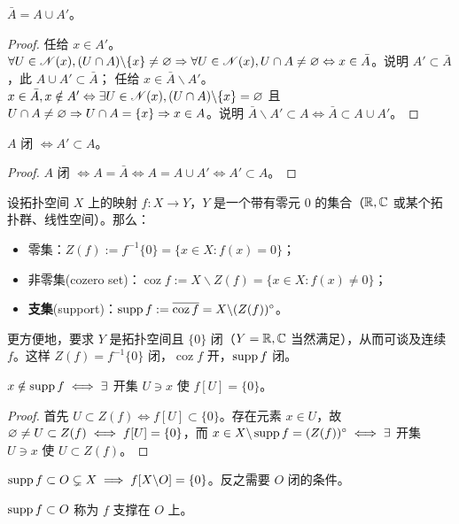 \begin{theorem}
    $\bar A=A\cup A'$。  
\end{theorem}

\begin{proof}
    任给 $x\in A'$。$\forall U\in\mathscr N(x),(U\cap A)\backslash\{x\}\ne\varnothing\Rightarrow \forall U\in\mathscr N(x),U\cap A\ne\varnothing\Leftrightarrow x\in\bar A$。说明 $A'\subset \bar A$，此 $A\cup A'\subset\bar A$；
    任给 $x\in\bar A\backslash A'$。$x\in\bar A,x\notin A'\Leftrightarrow \exists U\in\mathscr N(x),(U\cap A)\backslash\{x\}=\varnothing$ 且 $U\cap A\ne\varnothing\Rightarrow U\cap A=\{x\}\Rightarrow x\in A$。说明 $\bar A\backslash A'\subset A\iff \bar A\subset A\cup A'$。
\end{proof}

\begin{theorem}
    $A$ 闭 $\iff A'\subset A$。
\end{theorem}
\begin{proof}
    $A$ 闭 $\iff A=\bar A\iff A=A\cup A'\iff A'\subset A$。
\end{proof}

\begin{definition}
    设拓扑空间 $X$ 上的映射 $f: X \to Y$，$Y$ 是一个带有零元 $0$ 的集合（$\mathbb{R},\mathbb{C}$ 或某个拓扑群、线性空间）。那么：
    \begin{itemize}
        \item 零集：$Z(f):=f^{-1}\{0\}=\{x\in X: f(x)=0\}$；
        \item 非零集(cozero set)：$\operatorname{coz}f:=X\backslash Z(f)=\{x\in X: f(x)\ne 0\}$；
        \item \textbf{支集}(support)：$\operatorname{supp} f:=\overline{\operatorname{coz}f}
  = X\backslash (Z(f))^\circ$。
    \end{itemize}
    更方便地，要求 $Y$ 是拓扑空间且 $\{0\}$ 闭（$Y=\mathbb{R},\mathbb{C}$ 当然满足），从而可谈及连续 $f$。这样 $Z(f)=f^{-1}\{0\}$ 闭，$\operatorname{coz} f$ 开，$\operatorname{supp} f$ 闭。
\end{definition}

\begin{theorem}
     $x\notin \operatorname{supp} f\iff\exists$ 开集 $U\ni x$ 使 $f[U]=\{0\}$。
\end{theorem}
\begin{proof}
    首先 $U\subset Z(f)\iff f[U] \subset \{0\}$。存在元素 $x\in U$，故 $\varnothing\ne U\subset Z(f)\iff f[U]=\{0\}$，而 $x\in X\backslash\operatorname{supp} f = (Z(f))^\circ \iff \exists$ 开集 $U\ni x$ 使 $U\subset Z(f)$。
\end{proof}
\begin{theorem}
    $\operatorname{supp} f \subset O\subsetneq X\implies f[X\backslash O]=\{0\}$。反之需要 $O$ 闭的条件。
\end{theorem}
\begin{remark}
    $\operatorname{supp} f \subset O$ 称为 $f$ 支撑在 $O$ 上。
\end{remark}

